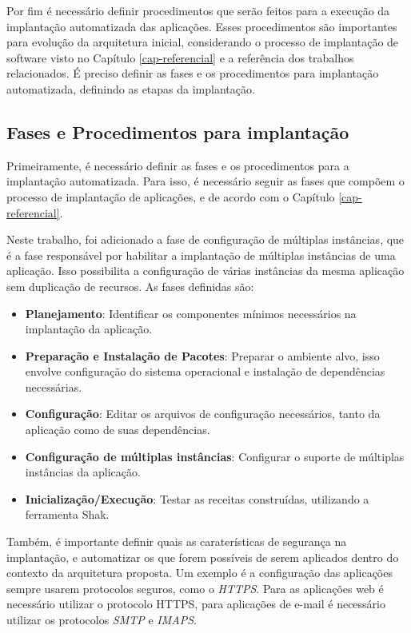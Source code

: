 Por fim é necessário definir procedimentos que serão
feitos para a execução da implantação automatizada das aplicações. Esses procedimentos são
importantes para evolução da arquitetura inicial, considerando
o processo de implantação de software visto no Capítulo \ref{cap-referencial}
e a referência dos trabalhos relacionados. É preciso definir as fases e os
procedimentos para implantação automatizada, definindo as etapas
da implantação.

\subsection{Fases e Procedimentos para implantação}
\label{sec:fases}

Primeiramente, é necessário definir as fases e os procedimentos para a implantação 
automatizada. Para isso, é necessário seguir as fases que compõem o processo de 
implantação de aplicações, e de acordo com o Capítulo \ref{cap-referencial}. 

Neste trabalho, foi adicionado a fase de configuração de múltiplas
instâncias, que é a fase responsável por habilitar a implantação de múltiplas 
instâncias de uma aplicação. Isso possibilita a configuração 
de várias instâncias da mesma aplicação sem duplicação de recursos. As fases 
definidas são:

\begin{itemize}
  \item  \textbf{Planejamento}: Identificar os componentes mínimos necessários na implantação
 da aplicação.  
  \item  \textbf{Preparação e Instalação de Pacotes}: Preparar o ambiente alvo, 
isso envolve configuração do sistema operacional e instalação de dependências necessárias.
  \item  \textbf{Configuração}: Editar os arquivos de configuração necessários, tanto 
da aplicação como de suas dependências.
  \item  \textbf{Configuração de múltiplas instâncias}: Configurar o suporte de múltiplas instâncias
da aplicação.   
  \item  \textbf{Inicialização/Execução}: Testar as receitas construídas, utilizando
a ferramenta Shak. 
\end{itemize}

Também, é importante definir quais as caraterísticas de segurança na implantação, e
automatizar os que forem possíveis de serem aplicados dentro do contexto da
arquitetura proposta. Um exemplo
é a configuração das aplicações sempre usarem protocolos seguros, como o \textit{HTTPS}. 
Para as aplicações web é necessário utilizar o protocolo HTTPS, para aplicações
de e-mail é necessário utilizar os protocolos \textit{SMTP} e \textit{IMAPS}.

